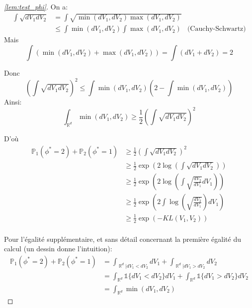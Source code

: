 \documentclass{article}
\DeclareMathOperator*{\R}{\mathbb{R}}
\theoremstyle{remark}
\theoremstyle{remark}
\begin{document}
\begin{proof}[\autoref{lem:test_phi}]
  On a:
  \begin{align*}
    \int \sqrt{dV_1dV_2} &= \int \sqrt{\min(dV_1, dV_2) \max(dV_1, dV_2)} \\
    &\leq \int \min(dV_1, dV_2) \int \max(dV_1, dV_2) & \text{(Cauchy-Schwartz)}
  \end{align*}
  Mais
  $$
  \int (\min(dV_1, dV_2) + \max(dV_1, dV_2)) = \int (dV_1 + dV_2) = 2
  $$

  Donc
  $$
  \left( \int \sqrt{dV_1dV_2} \right)^2 \leq \int \min(dV_1, dV_2) \left(2-\int \min(dV_1, dV_2) \right)
  $$
  Ainsi:
  $$
  \int_{\R^d} \min(dV_1,dV_2) \geq \frac{1}{2} \left( \int \sqrt{dV_1dV_2} \right)^2
  $$

  D'où
  \begin{align*}
    \mathbb{P}_1(\phi^*=2) + \mathbb{P}_2(\phi^*=1) &\geq \frac{1}{2} \left( \int \sqrt{dV_1dV_2} \right)^2 \\
    &\geq \frac{1}{2} \exp\left(2\log\left(\int \sqrt{dV_1dV_2}\right)\right) \\
    &\geq \frac{1}{2} \exp\left(2\log\left(\int \sqrt{\frac{dV_2}{dV_1}}dV_1\right)\right) \\
    &\geq \frac{1}{2} \exp\left(2\int \log\left(\sqrt{\frac{dV_2}{dV_1}}\right)dV_1\right) \\
    &\geq \frac{1}{2} \exp\left(-KL(V_1,V_2)\right) \\
  \end{align*}

  Pour l'égalité supplémentaire, et sans détail concernant la première égalité du calcul (un dessin donne l'intuition):
  \begin{align*}
    \mathbb{P}_1(\phi^*=2) + \mathbb{P}_2(\phi^*=1) &= \int_{\R^d | dV_1 < dV_2} dV_1 + \int_{\R^d | dV_1 > dV_2} dV_2 \\
    &= \int_{\R^d} \mathbb{1}\{dV_1 < dV_2\} dV_1 + \int_{\R^d} \mathbb{1}\{dV_1 > dV_2\}dV_2 \\
    &= \int_{\R^d} \min(dV_1,dV_2)
  \end{align*}
\end{proof}
\end{document}
